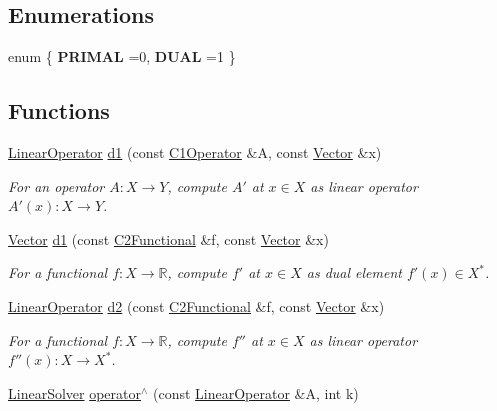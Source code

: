 \subsection*{Enumerations}
\begin{DoxyCompactItemize}
\item 
enum \{ {\bfseries P\-R\-I\-M\-A\-L} =0, 
{\bfseries D\-U\-A\-L} =1
 \}
\end{DoxyCompactItemize}
\subsection*{Functions}
\begin{DoxyCompactItemize}
\item 
\hyperlink{classSpacy_1_1LinearOperator}{Linear\-Operator} \hyperlink{namespaceSpacy_a2205e2a2c4bb5242665bbc09929d35d2}{d1} (const \hyperlink{classSpacy_1_1C1Operator}{C1\-Operator} \&A, const \hyperlink{classSpacy_1_1Vector}{Vector} \&x)
\begin{DoxyCompactList}\small\item\em For an operator $ A: X\to Y $, compute $A'$ at $x\in X$ as linear operator $ A'(x): X \to Y $. \end{DoxyCompactList}\item 
\hyperlink{classSpacy_1_1Vector}{Vector} \hyperlink{namespaceSpacy_ab6646eb7068eb9f1369e639cf0b620a2}{d1} (const \hyperlink{classSpacy_1_1C2Functional}{C2\-Functional} \&f, const \hyperlink{classSpacy_1_1Vector}{Vector} \&x)
\begin{DoxyCompactList}\small\item\em For a functional $ f: X\to \mathbb{R} $, compute $f'$ at $x\in X$ as dual element $ f'(x) \in X^* $. \end{DoxyCompactList}\item 
\hyperlink{classSpacy_1_1LinearOperator}{Linear\-Operator} \hyperlink{namespaceSpacy_a569d8fc0b4a0e292f257dd6307a25c8f}{d2} (const \hyperlink{classSpacy_1_1C2Functional}{C2\-Functional} \&f, const \hyperlink{classSpacy_1_1Vector}{Vector} \&x)
\begin{DoxyCompactList}\small\item\em For a functional $ f: X\to \mathbb{R} $, compute $f''$ at $x\in X$ as linear operator $ f''(x): X \to X^* $. \end{DoxyCompactList}\item 
\hypertarget{namespaceSpacy_ab1be097dacbf27785979de79ed5b3178}{\hyperlink{namespaceSpacy_adcd0d78166a9c972b8a2e5a689fc2d03}{Linear\-Solver} \hyperlink{namespaceSpacy_ab1be097dacbf27785979de79ed5b3178}{operator$^\wedge$} (const \hyperlink{classSpacy_1_1LinearOperator}{Linear\-Operator} \&A, int k)}\label{namespaceSpacy_ab1be097dacbf27785979de79ed5b3178}


\end{DoxyCompactItemize}
